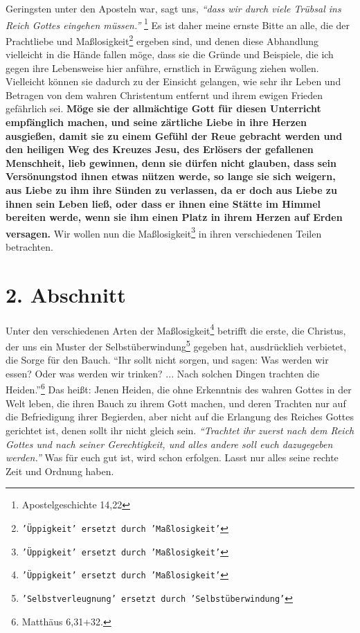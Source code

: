 Geringsten unter den Aposteln war, sagt uns,
\textit{"`dass wir durch viele Trübsal ins
Reich Gottes eingehen müssen."'}
\footnote{Apostelgeschichte 14,22}
Es ist daher meine
ernste Bitte an alle, die der Prachtliebe und
Maßlosigkeit\footnote{\texttt{'Üppigkeit' ersetzt durch
'Maßlosigkeit'}} ergeben sind, und
denen diese Abhandlung vielleicht in die Hände fallen möge, dass sie die Gründe
und Beispiele, die ich gegen ihre Lebensweise hier anführe, ernstlich in
Erwägung ziehen wollen. Vielleicht können sie dadurch zu der Einsicht gelangen,
wie sehr ihr Leben und Betragen von dem wahren
Christentum entfernt
und ihrem
ewigen Frieden gefährlich sei.
\label{ref:14_01_wahre_nachfolger_suenetod}
\textbf{Möge sie der allmächtige Gott für diesen
Unterricht empfänglich machen, und seine zärtliche Liebe in ihre Herzen
ausgießen, damit sie zu einem Gefühl der Reue gebracht werden
und den heiligen
Weg des Kreuzes Jesu, des Erlösers der
gefallenen
Menschheit, lieb gewinnen,
denn sie dürfen nicht glauben, dass sein Versönungstod
ihnen etwas nützen werde,
so lange sie sich weigern, aus Liebe zu ihm ihre Sünden zu
verlassen, da er doch
aus Liebe zu ihnen sein Leben ließ, oder dass er ihnen eine Stätte im Himmel
bereiten werde, wenn sie ihm einen Platz in ihrem Herzen auf Erden versagen.}
Wir
wollen nun die Maßlosigkeit\footnote{\texttt{'Üppigkeit' ersetzt durch
'Maßlosigkeit'}}
in ihren verschiedenen Teilen betrachten.

\section{2. Abschnitt} \label{kap14_ab2}

Unter den verschiedenen Arten der Maßlosigkeit\footnote{\texttt{'Üppigkeit'
ersetzt durch 'Maßlosigkeit'}} betrifft die erste, die Christus,
der uns ein Muster der Selbstüberwindung\footnote{\texttt{'Selbstverleugnung'
ersetzt durch 'Selbstüberwindung'}} gegeben hat, ausdrücklieh verbietet,
die Sorge für den Bauch.
"`Ihr sollt nicht sorgen, und sagen: Was werden wir
essen? Oder was werden wir trinken? ... Nach solchen Dingen trachten die
Heiden."'\footnote{Matthäus 6,31+32.}
Das heißt: Jenen Heiden, die ohne
Erkenntnis des wahren Gottes in der Welt leben, die ihren
Bauch zu ihrem Gott
machen, und deren Trachten nur auf die Befriedigung ihrer
Begierden, aber nicht
auf die Erlangung des Reiches Gottes gerichtet ist, denen
sollt ihr nicht gleich
sein.
\textit{"`Trachtet ihr zuerst nach dem Reich Gottes und nach seiner
Gerechtigkeit, und alles andere soll euch dazugegeben werden."'} Was für euch
gut
ist, wird schon erfolgen. Lasst nur alles seine rechte Zeit
und Ordnung haben.

